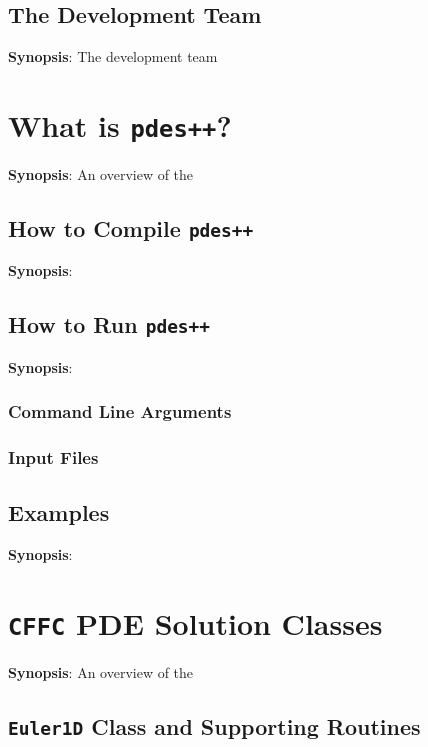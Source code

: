\documentclass[11pt]{report}
\begin{document}
\section{The Development Team}

{\bf Synopsis}: The development team  

\chapter{What is {\tt pdes++}?}

{\bf Synopsis}: An overview of the

\section{How to Compile {\tt pdes++}}

{\bf Synopsis}:

\section{How to Run {\tt pdes++}}

{\bf Synopsis}:

\subsection{Command Line Arguments}

\subsection{Input Files}

\section{Examples}

{\bf Synopsis}:

\chapter{{\tt CFFC} PDE Solution Classes}

{\bf Synopsis}: An overview of the

\section{{\tt Euler1D} Class and Supporting Routines}
\end{document}
